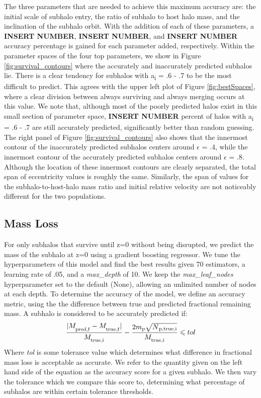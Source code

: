 \documentclass[fleqn,usenatbib]{mnras}
\begin{document}
The three parameters that are needed to achieve this maximum accuracy are: the initial scale of subhalo entry, the ratio of subhalo to host halo mass, and the inclination of the subhalo orbit. With the addition of each of these parameters, a \textbf{INSERT NUMBER}, \textbf{INSERT NUMBER}, and  \textbf{INSERT NUMBER} accuracy percentage is gained for each parameter added, respectively. Within the parameter spaces of the four top parameters, we show in Figure \ref{fig:survival_contours} where the accurately and inaccurately predicted subhalos lie. There is a clear tendency for subhalos with a\textsubscript{i} =  .6 - .7 to be the most difficult to predict. This agrees with the upper left plot of Figure \ref{fig:bestSpaces}, where a clear division between always surviving and always merging occurs at this value. We note that, although most of the poorly predicted halos exist in this small section of parameter space, \textbf{INSERT NUMBER} percent of halos with a\textsubscript{i} =  .6 - .7 are still accurately predicted, significantly better than random guessing. The right panel of Figure \ref{fig:survival_contours} also shows that the innermost contour of the inaccurately predicted subhalos centers around $\epsilon$ = .4, while the innermost contour of the accurately predicted subhalos centers around $\epsilon$ = .8. Although the location of these innermost contours are clearly separated, the total span of eccentricity values is roughly the same. Similarly, the span of values for the subhalo-to-host-halo mass ratio and initial relative velocity are not noticeably different for the two populations.

\subsection{Mass Loss}
\label{sec:mass loss}
For only subhalos that survive until z=0 without being disrupted, we predict the mass of the subhalo at z=0 using a gradient boosting regressor. We tune the hyperparameters of this model and find the best results given 70 estimators, a learning rate of .05, and a \textit{max\_depth} of 10. We keep the \textit{max\_leaf\_nodes} hyperparameter set to the default (None), allowing an unlimited number of nodes at each depth. To determine the accuracy of the model, we define an accuracy metric, using the the difference between true and predicted fractional remaining mass. A subhalo is considered to be accurately predicted if:
\begin{equation}
    \label{eq:mass loss}
    \frac{|M_\textsubscript{pred,f} - M_\textsubscript{true,f}|}{M_\textsubscript{true,i}} - \frac{2m\textsubscript{p}\sqrt{N\textsubscript{p,true,i}}}{M_\textsubscript{true,i}} \leq tol
\end{equation}
Where \textit{tol} is some tolerance value which determines what difference in fractional mass loss is acceptable as accurate. We refer to the quantity given on the left hand side of the equation as the accuracy score for a given subhalo. We then vary the tolerance which we compare this score to, determining what percentage of subhalos are within certain tolerance thresholds. 
\end{document}
